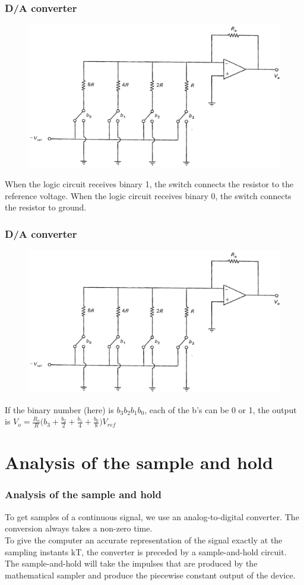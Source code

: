 \begin{frame}
	\frametitle{D/A converter}
	\vspace{-2ex}
	\begin{figure}
		\includegraphics[width=0.8\linewidth]{DAconverter}
	\end{figure}
	When the logic circuit receives binary 1, the switch connects the resistor to the reference voltage. When the logic circuit receives binary 0, the switch connects the resistor to ground.
\end{frame}

\begin{frame}
	\frametitle{D/A converter}
	\vspace{-3ex}
	\begin{figure}
		\includegraphics[width=0.8\linewidth]{DAconverter}
	\end{figure}
	If the binary number (here) is $b_3b_2b_1b_0$, each of the b's can be 0 or 1, the output is $V_o = \frac{R_o}{R} \Big(b_3+\frac{b_2}{2} + \frac{b_1}{4}+\frac{b_0}{8}\Big) V_{ref}$
\end{frame}

\section{Analysis of the sample and hold}

\begin{frame}
	\frametitle{Analysis of the sample and hold}
	To get samples of a continuous signal, we use an analog-to-digital converter. The conversion always takes a non-zero time.\\
	\vspace{1em}
	To give the computer an accurate representation of the signal exactly at the sampling instants kT, the converter is preceded by a sample-and-hold circuit.\\
	\vspace{1em}
	The sample-and-hold will take the impulses that are produced by the mathematical sampler and produce the piecewise constant output of the device.
\end{frame}

